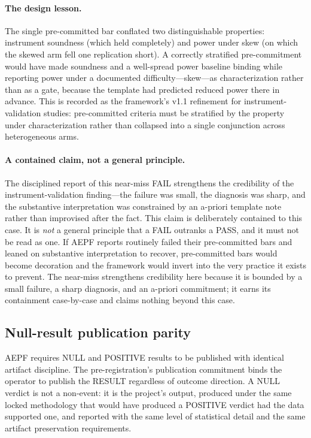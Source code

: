 \documentclass[11pt]{article}
\begin{document}
\paragraph{The design lesson.}
The single pre-committed bar conflated two distinguishable properties:
instrument soundness (which held completely) and power under skew (on
which the skewed arm fell one replication short). A correctly
stratified pre-commitment would have made soundness and a
well-spread power baseline binding while reporting power under a
documented difficulty---skew---as characterization rather than as a
gate, because the template had predicted reduced power there in
advance. This is recorded as the framework's v1.1 refinement for
instrument-validation studies: pre-committed criteria must be
stratified by the property under characterization rather than
collapsed into a single conjunction across heterogeneous arms.

\paragraph{A contained claim, not a general principle.}
The disciplined report of this near-miss FAIL strengthens the
credibility of the instrument-validation finding---the failure was
small, the diagnosis was sharp, and the substantive interpretation
was constrained by an a-priori template note rather than improvised
after the fact. This claim is deliberately contained to this case. It
is \emph{not} a general principle that a FAIL outranks a PASS, and it
must not be read as one. If AEPF reports routinely failed their
pre-committed bars and leaned on substantive interpretation to
recover, pre-committed bars would become decoration and the framework
would invert into the very practice it exists to prevent. The
near-miss strengthens credibility here because it is bounded by a
small failure, a sharp diagnosis, and an a-priori commitment; it
earns its containment case-by-case and claims nothing beyond this
case.

\subsection{Null-result publication parity}
\label{subsec:null-parity}

AEPF requires NULL and POSITIVE results to be published with
identical artifact discipline. The pre-registration's publication
commitment binds the operator to publish the RESULT regardless of
outcome direction. A NULL verdict is not a non-event: it is the
project's output, produced under the same locked methodology that
would have produced a POSITIVE verdict had the data supported one,
and reported with the same level of statistical detail and the same
artifact preservation requirements.
\end{document}
